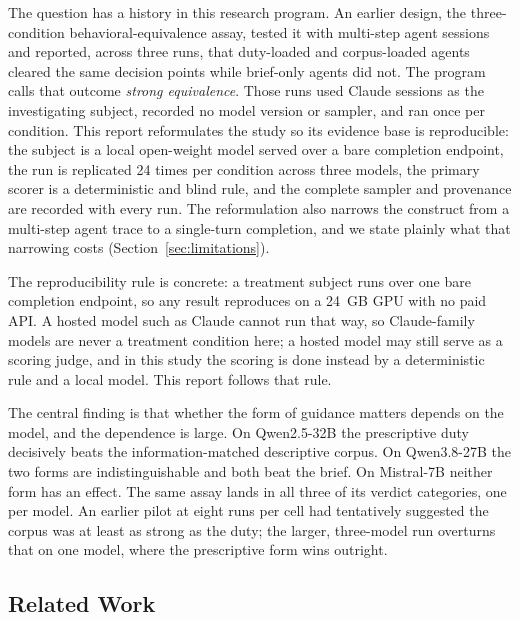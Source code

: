 \documentclass[11pt,a4paper]{article}
\begin{document}
The question has a history in this research program. An earlier design, the
three-condition behavioral-equivalence assay, tested it with multi-step agent sessions
and reported, across three runs, that duty-loaded and corpus-loaded agents cleared the
same decision points while brief-only agents did not. The program calls that outcome
\emph{strong equivalence}. Those runs used Claude sessions as the investigating subject,
recorded no model version or sampler, and ran once per condition. This report
reformulates the study so its evidence base is reproducible: the subject is a local
open-weight model served over a bare completion endpoint, the run is replicated 24 times
per condition across three models, the primary scorer is a deterministic and blind rule,
and the complete sampler and provenance are recorded with every run. The reformulation
also narrows the construct from a multi-step agent trace to a single-turn completion, and
we state plainly what that narrowing costs (Section~\ref{sec:limitations}).

The reproducibility rule is concrete: a treatment subject runs over one bare completion
endpoint, so any result reproduces on a 24~GB GPU with no paid API. A hosted model such
as Claude cannot run that way, so Claude-family models are never a treatment condition
here; a hosted model may still serve as a scoring judge, and in this study the scoring is
done instead by a deterministic rule and a local model. This report follows that rule.

The central finding is that whether the form of guidance matters depends on the model,
and the dependence is large. On Qwen2.5-32B the prescriptive duty decisively beats the
information-matched descriptive corpus. On Qwen3.8-27B the two forms are indistinguishable
and both beat the brief. On Mistral-7B neither form has an effect. The same assay lands in
all three of its verdict categories, one per model. An earlier pilot at eight runs per
cell had tentatively suggested the corpus was at least as strong as the duty; the larger,
three-model run overturns that on one model, where the prescriptive form wins outright.

\subsection{Related Work}
\end{document}
